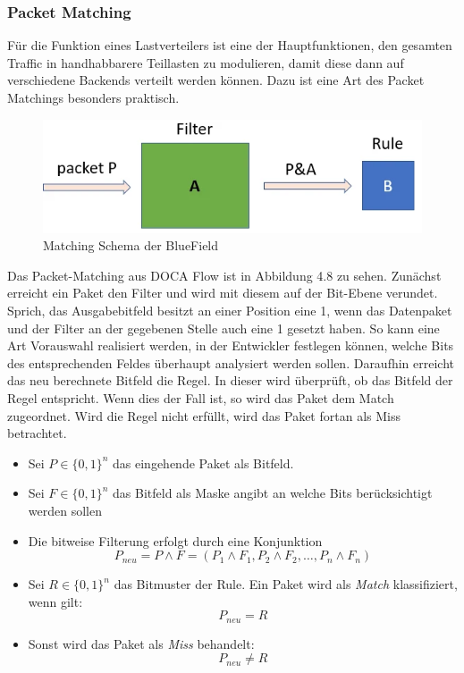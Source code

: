 \subsubsection{Packet Matching}
Für die Funktion eines Lastverteilers ist eine der Hauptfunktionen, den gesamten Traffic in handhabbarere Teillasten zu modulieren, damit diese dann auf verschiedene Backends verteilt werden können. Dazu ist eine Art des Packet Matchings besonders praktisch. 
\begin{figure}
    \centering
    \includegraphics[width=1\linewidth]{images/paketmatchng.png}
    \caption{Matching Schema der BlueField}
    \label{fig:enter-label}
\end{figure}
Das Packet-Matching aus DOCA Flow ist in Abbildung 4.8 zu sehen. Zunächst erreicht ein Paket den Filter und wird mit diesem auf der Bit-Ebene verundet. Sprich, das Ausgabebitfeld besitzt an einer Position eine 1, wenn das Datenpaket und der Filter an der gegebenen Stelle auch eine 1 gesetzt haben. So kann eine Art Vorauswahl realisiert werden, in der Entwickler festlegen können, welche Bits des entsprechenden Feldes überhaupt analysiert werden sollen. Daraufhin erreicht das neu berechnete Bitfeld die Regel. In dieser wird überprüft, ob das Bitfeld der Regel entspricht. Wenn dies der Fall ist, so wird das Paket dem Match zugeordnet. Wird die Regel nicht erfüllt, wird das Paket fortan als Miss betrachtet.
\begin{itemize}
  \item Sei $P \in \{0,1\}^n$ das eingehende Paket als Bitfeld.
  \item Sei $F \in \{0,1\}^n$ das Bitfeld als Maske angibt an welche Bits berücksichtigt werden sollen
  \item Die bitweise Filterung erfolgt durch eine Konjunktion  
  \[
    P_{neu} = P \land F = (P_1 \land F_1, P_2 \land F_2, \dots, P_n \land F_n)
  \]
  \item Sei $R \in \{0,1\}^n$ das Bitmuster der Rule. Ein Paket wird als \emph{Match} klassifiziert, wenn gilt:
  \[
    P_{neu} = R
  \]
  \item Sonst wird das Paket als \emph{Miss} behandelt:
  \[
    P_{neu} \ne R
  \]
\end{itemize}

